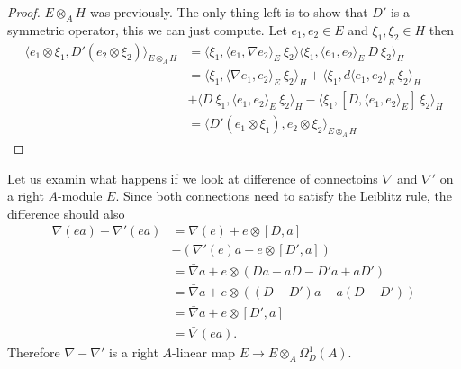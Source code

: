 \begin{proof}
    $E\otimes _A H$ was previously. The only thing left is to show that $D'$ is a symmetric
    operator, this we can just compute. Let $e_1, e_2 \in E$ and $\xi _1,
    \xi _2 \in H$ then
    \begin{align}
        \langle e_1 \otimes \xi _1, D'(e_2 \otimes \xi_2)\rangle _{E\otimes _A H} &=
        \langle \xi _1, \langle e_1, \nabla e_2\rangle _E\ \xi _2\rangle
        \langle \xi _1 , \langle e_1, e_2\rangle _E\ D\ \xi_2\rangle_H  \nonumber\\
        &= \langle \xi _1, \langle \nabla e_1, e_2\rangle _E\ \xi _2\rangle _H + \langle \xi _1, d\langle e_1, e_2\rangle  _E
        \ \xi _2\rangle _H \nonumber\\
        &+ \langle D\ \xi _1,\langle e_1, e_2\rangle _E\ \xi _2\rangle _H -
        \langle \xi _1, [D, \langle e_1, e_2\rangle _E]\ \xi
        _2 \rangle _H \nonumber\\
        &= \langle D'(e_1 \otimes \xi _1), e_2 \otimes \xi _2\rangle _{E \otimes _A H}
    \end{align}
\end{proof}

Let us examin what happens if we look at difference of connectoins $\nabla$ and
$\nabla'$ on a right $A$-module $E$. Since both connections need to satisfy
the Leiblitz rule, the difference should also
    \begin{align}
        \nabla(ea)-\nabla'(ea)&=\nabla(e) + e\otimes[D, a]\nonumber\\
        &-(\nabla'(e)a + e\otimes[D',a])\nonumber\\
        &=\bar{\nabla}a + e\otimes(Da-aD-D'a+aD')\nonumber\\
        &=\bar{\nabla}a + e\otimes((D-D')a-a(D-D'))\nonumber\\
        &=\bar{\nabla}a + e\otimes[D', a]\nonumber\\
        &=\bar{\nabla}(ea).
    \end{align}
Therefore $\nabla-\nabla'$ is a right $A$-linear map
$E \rightarrow E\otimes _A \Omega _D^1(A)$.

